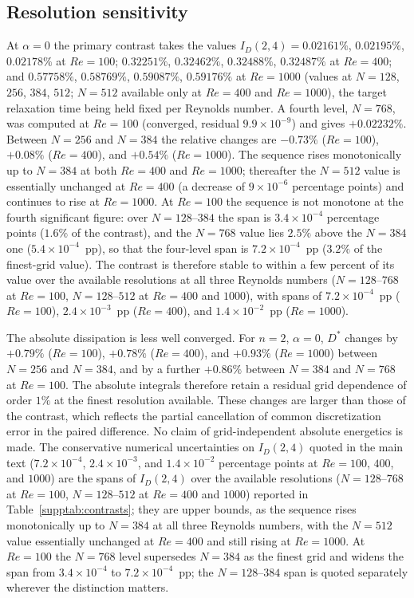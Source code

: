 \subsection{Resolution sensitivity}

At $\alpha=0$ the primary contrast takes the values $I_D(2,4)=0.02161\%$, $0.02195\%$, $0.02178\%$ at $Re=100$; $0.32251\%$, $0.32462\%$, $0.32488\%$, $0.32487\%$ at $Re=400$; and $0.57758\%$, $0.58769\%$, $0.59087\%$, $0.59176\%$ at $Re=1000$ (values at $N=128$, $256$, $384$, $512$; $N=512$ available only at $Re=400$ and $Re=1000$), the target relaxation time being held fixed per Reynolds number. A fourth level, $N=768$, was computed at $Re=100$ (converged, residual $9.9\times10^{-9}$) and gives $+0.02232\%$. Between $N=256$ and $N=384$ the relative changes are $-0.73\%$ ($Re=100$), $+0.08\%$ ($Re=400$), and $+0.54\%$ ($Re=1000$). The sequence rises monotonically up to $N=384$ at both $Re=400$ and $Re=1000$; thereafter the $N=512$ value is essentially unchanged at $Re=400$ (a decrease of $9\times10^{-6}$ percentage points) and continues to rise at $Re=1000$. At $Re=100$ the sequence is not monotone at the fourth significant figure: over $N=128$--$384$ the span is $3.4\times10^{-4}$ percentage points ($1.6\%$ of the contrast), and the $N=768$ value lies $2.5\%$ above the $N=384$ one ($5.4\times10^{-4}$~pp), so that the four-level span is $7.2\times10^{-4}$~pp ($3.2\%$ of the finest-grid value). The contrast is therefore stable to within a few percent of its value over the available resolutions at all three Reynolds numbers ($N=128$--$768$ at $Re=100$, $N=128$--$512$ at $Re=400$ and $1000$), with spans of $7.2\times10^{-4}$~pp ($Re=100$), $2.4\times10^{-3}$~pp ($Re=400$), and $1.4\times10^{-2}$~pp ($Re=1000$).

The absolute dissipation is less well converged. For $n=2$, $\alpha=0$, $D^*$ changes by $+0.79\%$ ($Re=100$), $+0.78\%$ ($Re=400$), and $+0.93\%$ ($Re=1000$) between $N=256$ and $N=384$, and by a further $+0.86\%$ between $N=384$ and $N=768$ at $Re=100$. The absolute integrals therefore retain a residual grid dependence of order $1\%$ at the finest resolution available. These changes are larger than those of the contrast, which reflects the partial cancellation of common discretization error in the paired difference. No claim of grid-independent absolute energetics is made. The conservative numerical uncertainties on $I_D(2,4)$ quoted in the main text ($7.2\times10^{-4}$, $2.4\times10^{-3}$, and $1.4\times10^{-2}$ percentage points at $Re = 100$, $400$, and $1000$) are the spans of $I_D(2,4)$ over the available resolutions ($N = 128$--$768$ at $Re=100$, $N = 128$--$512$ at $Re=400$ and $1000$) reported in Table~\ref{supptab:contrasts}; they are upper bounds, as the sequence rises monotonically up to $N=384$ at all three Reynolds numbers, with the $N=512$ value essentially unchanged at $Re=400$ and still rising at $Re=1000$. At $Re=100$ the $N=768$ level supersedes $N=384$ as the finest grid and widens the span from $3.4\times10^{-4}$ to $7.2\times10^{-4}$~pp; the $N=128$--$384$ span is quoted separately wherever the distinction matters.

